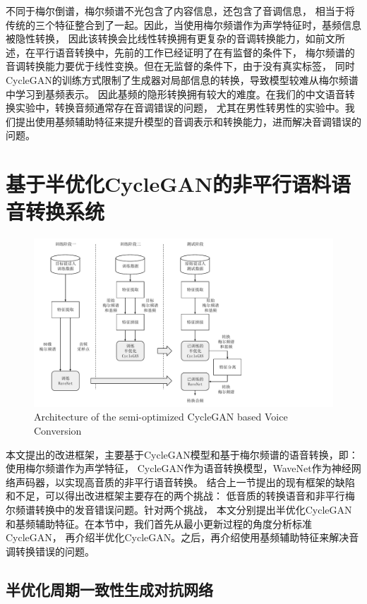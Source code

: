不同于梅尔倒谱，梅尔频谱不光包含了内容信息，还包含了音调信息，
相当于将传统的三个特征整合到了一起。因此，当使用梅尔频谱作为声学特征时，基频信息被隐性转换，
因此该转换会比线性转换拥有更复杂的音调转换能力，如前文所述，在平行语音转换中，先前的工作已经证明了在有监督的条件下，
梅尔频谱的音调转换能力要优于线性变换。但在无监督的条件下，由于没有真实标签，
同时CycleGAN的训练方式限制了生成器对局部信息的转换，导致模型较难从梅尔频谱中学习到基频表示。
因此基频的隐形转换拥有较大的难度。在我们的中文语音转换实验中，转换音频通常存在音调错误的问题，
尤其在男性转男性的实验中。我们提出使用基频辅助特征来提升模型的音调表示和转换能力，进而解决音调错误的问题。

\section{基于半优化CycleGAN的非平行语料语音转换系统}

\begin{figure}[!htp]
    \centering
    \includegraphics[width=12cm,trim=0 10 200 0,clip]{figure/4_proposedarch.pdf}
    {Architecture of the semi-optimized CycleGAN based Voice Conversion}
    \label{fig:proposedarch}
\end{figure}

本文提出的改进框架，主要基于CycleGAN模型和基于梅尔频谱的语音转换，即：使用梅尔频谱作为声学特征，
CycleGAN作为语音转换模型，WaveNet作为神经网络声码器，以实现高音质的非平行语音转换。
结合上一节提出的现有框架的缺陷和不足，可以得出改进框架主要存在的两个挑战：
低音质的转换语音和非平行梅尔频谱转换中的发音错误问题。针对两个挑战，
本文分别提出半优化CycleGAN和基频辅助特征。在本节中，我们首先从最小更新过程的角度分析标准CycleGAN，
再介绍半优化CycleGAN。之后，再介绍使用基频辅助特征来解决音调转换错误的问题。

\subsection{半优化周期一致性生成对抗网络}

